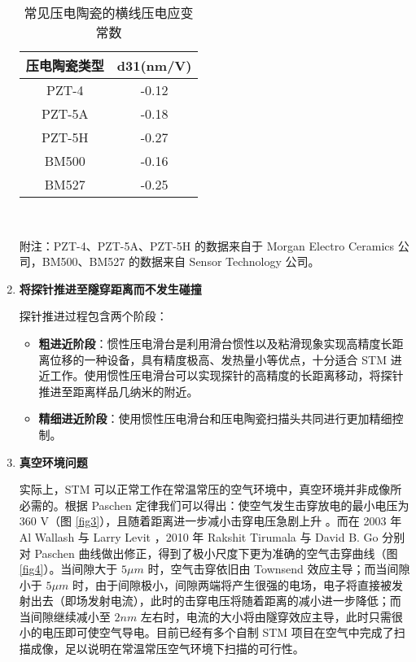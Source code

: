 \documentclass{article}
\begin{document}
\begin{enumerate}
	      \begin{table}[H]
		      \small
		      \caption{常见压电陶瓷的横线压电应变常数}
		      \centering
		      \begin{tabular}{cc}
			      \toprule
			      \qquad\textbf{压电陶瓷类型}\qquad\qquad & \qquad \textbf{d31(nm/V)} \qquad\qquad \\
			      \midrule
			      PZT-4                             & -0.12                                  \\
			      PZT-5A                            & -0.18                                  \\
			      PZT-5H                            & -0.27                                  \\
			      BM500                             & -0.16                                  \\
			      BM527                             & -0.25                                  \\
			      \bottomrule
		      \end{tabular}\\\vskip 1mm
		      \begin{minipage}{0.5\linewidth}
			      附注：PZT-4、PZT-5A、PZT-5H 的数据来自于 Morgan Electro Ceramics 公司，BM500、BM527 的数据来自 Sensor Technology 公司。
		      \end{minipage}
		      \label{tab1}
	      \end{table}

	\item \textbf{将探针推进至隧穿距离而不发生碰撞}\par
	      探针推进过程包含两个阶段：
	      \begin{itemize}
		      \item \textbf{粗进近阶段}：惯性压电滑台是利用滑台惯性以及粘滑现象实现高精度长距离位移的一种设备，具有精度极高、发热量小等优点，十分适合 STM 进近工作。使用惯性压电滑台可以实现探针的高精度的长距离移动，将探针推进至距离样品几纳米的附近。

		      \item \textbf{精细进近阶段}：使用惯性压电滑台和压电陶瓷扫描头共同进行更加精细控制。

	      \end{itemize}

	\item \textbf{真空环境问题}\par
	      \qquad 实际上，STM 可以正常工作在常温常压的空气环境中，真空环境并非成像所必需的。根据 Paschen 定律我们可以得出：使空气发生击穿放电的最小电压为 360 V（图 \ref{fig3}），且随着距离进一步减小击穿电压急剧上升 。而在 2003 年 Al Wallash 与 Larry Levit ，2010 年 Rakshit Tirumala 与 David B. Go 分别对 Paschen  曲线做出修正，得到了极小尺度下更为准确的空气击穿曲线（图 \ref{fig4}）\cite{ref14,ref15}。当间隙大于 $5\mu m$ 时，空气击穿依旧由 Townsend 效应主导；而当间隙小于 $5\mu m$ 时，由于间隙极小，间隙两端将产生很强的电场，电子将直接被发射出去（即场发射电流），此时的击穿电压将随着距离的减小进一步降低；而当间隙继续减小至 $2nm$ 左右时，电流的大小将由隧穿效应主导，此时只需很小的电压即可使空气导电。目前已经有多个自制 STM 项目在空气中完成了扫描成像\cite{ref16,ref17}，足以说明在常温常压空气环境下扫描的可行性。


\end{enumerate}
\end{document}
